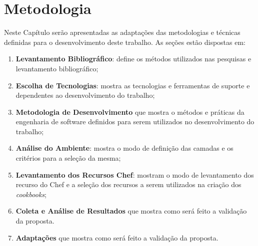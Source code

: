 \newpage\null\thispagestyle{empty}\newpage
\chapter{Metodologia}
\label{chap:metod}

Neste Capítulo serão apresentadas as adaptações das metodologias e técnicas
definidas para o desenvolvimento deste trabalho. As seções estão dispostas
em:

\begin{enumerate}
  \item \textbf{Levantamento Bibliográfico}: define os métodos utilizados nas
    pesquisas e levantamento bibliográfico;
  \item \textbf{Escolha de Tecnologias}: mostra as tecnologias e
    ferramentas de suporte e dependentes ao desenvolvimento do trabalho;
  \item \textbf{Metodologia de Desenvolvimento} que mostra o métodos e práticas da engenharia de software
    definidos para serem utilizados no desenvolvimento do trabalho;
  \item \textbf{Análise do Ambiente}: mostra o modo de definição das camadas e os critérios para
    a seleção da mesma;
  \item \textbf{Levantamento dos Recursos Chef}: mostram o modo de levantamento dos recurso do Chef
    e a seleção dos recursos a serem utilizados na criação dos \textit{cookbooks};
  \item \textbf{Coleta e Análise de Resultados} que mostra como será feito a validação da proposta.
  \item \textbf{Adaptações} que mostra como será feito a validação da proposta.
\end{enumerate}







